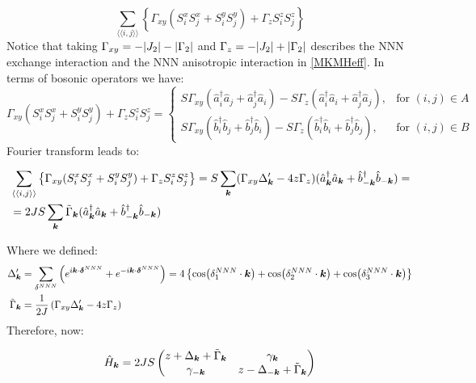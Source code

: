 \begin{equation}
\sum_{\langle \langle i,j \rangle \rangle} \left\{ \Gamma_{xy}(S_i^xS_j^x + S_i^yS_j^y) + \Gamma_zS_i^zS_j^z\right\}
\end{equation}
Notice that taking $\Gamma_{xy} = -\abs{J_2}-\abs{\Gamma_2}$ and $\Gamma_z = -\abs{J_2}+\abs{\Gamma_2}$ describes the NNN exchange interaction and the NNN anisotropic interaction in \ref{MKMHeff}. In terms of bosonic operators we have:
\begin{equation}
\Gamma_{xy}(S_i^xS_j^x + S_i^yS_j^y) + \Gamma_zS_i^zS_j^z = \begin{cases}
             S\Gamma_{xy}(\hat{a}_i^\dagger\hat{a}_j+\hat{a}_j^\dagger\hat{a}_i) - S\Gamma_z(\hat{a}_i^\dagger\hat{a}_i+\hat{a}_j^\dagger\hat{a}_j),  & \text{for } (i,j) \in A \\
             S\Gamma_{xy}(\hat{b}_i^\dagger\hat{b}_j+\hat{b}_j^\dagger\hat{b}_i) - S\Gamma_z(\hat{b}_i^\dagger\hat{b}_i+\hat{b}_j^\dagger\hat{b}_j),  & \text{for } (i,j) \in B
       \end{cases} \quad
\end{equation}
Fourier transform leads to:

\begin{align*}
&\sum_{\langle \langle i,j \rangle \rangle} \left\{ \Gamma_{xy}(S_i^xS_j^x + S_i^yS_j^y) + \Gamma_zS_i^zS_j^z\right\}
= S\sum_{\boldsymbol{k}} (\Gamma_{xy}\Delta'_{\boldsymbol{k}}-4z\Gamma_z) (\hat{a}^\dagger_{\boldsymbol{k}}\hat{a}_{\boldsymbol{k}}+\hat{b}^\dagger_{-\boldsymbol{k}}\hat{b}_{-\boldsymbol{k}}) = \\
&=2JS\sum_{\boldsymbol{k}} \tilde{\Gamma}_{\boldsymbol{k}}(\hat{a}^\dagger_{\boldsymbol{k}}\hat{a}_{\boldsymbol{k}}+\hat{b}^\dagger_{-\boldsymbol{k}}\hat{b}_{-\boldsymbol{k}})
\end{align*}

Where we defined:
\begin{align*}
\Delta'_{\boldsymbol{k}} &= \sum_{\delta^{NNN}} \left( e^{i\boldsymbol{k}\cdot \boldsymbol{\delta}^{NNN}} +  e^{-i\boldsymbol{k}\cdot \boldsymbol{\delta}^{NNN}}\right) = 4\left\{ \cos(\delta^{NNN}_1\cdot\boldsymbol{k}) + \cos(\delta^{NNN}_2\cdot\boldsymbol{k}) + \cos(\delta^{NNN}_3\cdot\boldsymbol{k})\right\} \\
\tilde{\Gamma}_{\boldsymbol{k}} &= \frac{1}{2J}\left( \Gamma_{xy}\Delta'_{\boldsymbol{k}}-4z\Gamma_z \right)
\end{align*}
Therefore, now:

\begin{equation}
\hat{H}_{\boldsymbol{k}} = 2JS\begin{pmatrix} 
z + \Delta_{\boldsymbol{k}} + \tilde{\Gamma}_{\boldsymbol{k}} & \gamma_{\boldsymbol{k}} \\
\gamma_{-\boldsymbol{k}} & z - \Delta_{-\boldsymbol{k}} + \tilde{\Gamma}_{\boldsymbol{k}}
\end{pmatrix}
\end{equation}

